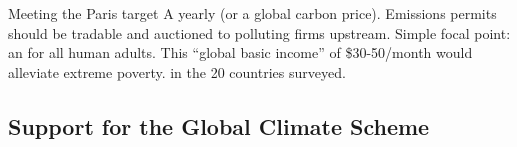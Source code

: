 \documentclass[aspectratio=169,xcolor=dvipsnames, 11pt,mathserif]{beamer}
\begin{document}




\begin{frame}{Meeting the Paris target}
\bbsp \ip {}
\ip \quad A yearly  \pause (or a global carbon price).
\ip Emissions permits should be tradable and auctioned to polluting firms upstream.
\ip {}
\ip \quad Simple focal point: an  for all human adults.
\ip \quad This ``global basic income'' of \$30-50/month would alleviate extreme poverty. 
\ip {}   in the 20 countries surveyed.
\ee    
\end{frame}


\subsection{Support for the Global Climate Scheme}
\end{document}
